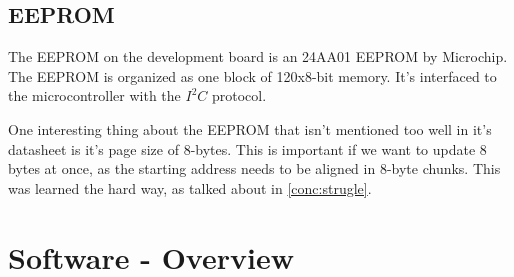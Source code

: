 \documentclass[12pt, a4paper]{article}
\begin{document}
    \subsection{EEPROM} \label{hardware:eeprom}
    The EEPROM on the development board is an 24AA01 EEPROM by Microchip. The EEPROM is organized as one block of 120x8-bit memory. It's interfaced to the microcontroller with the $I^2C$ protocol. 
    
    One interesting thing about the EEPROM that isn't mentioned too well in it's datasheet is it's page size of 8-bytes. This is important if we want to update 8 bytes at once, as the starting address needs to be aligned in 8-byte chunks. This was learned the hard way, as talked about in \cref{conc:strugle}.
    
    \section{Software - Overview}
\end{document}
